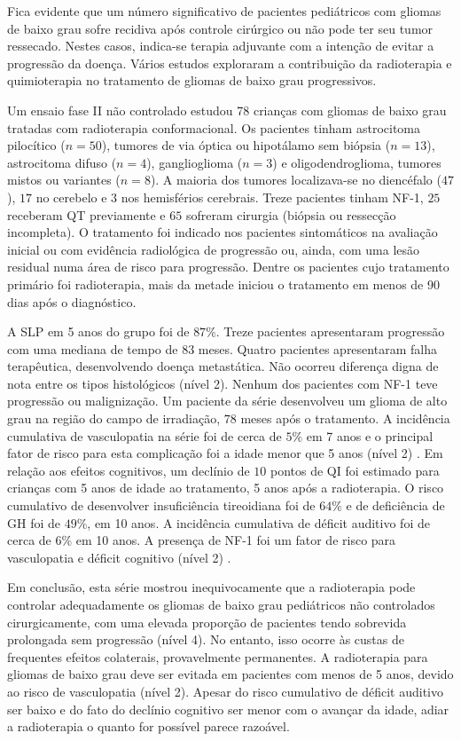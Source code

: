 \documentclass[11pt,a4paper,oldfontcommands]{memoir}
\begin{document}
Fica evidente que um número significativo de pacientes pediátricos com gliomas de baixo grau sofre recidiva após controle cirúrgico ou não pode ter seu tumor ressecado. Nestes casos, indica-se terapia adjuvante com a intenção de evitar a progressão da doença. Vários estudos exploraram a contribuição da radioterapia e quimioterapia no tratamento de gliomas de baixo grau progressivos. 

Um ensaio fase II não controlado estudou 78 crianças com gliomas de baixo grau tratadas com radioterapia conformacional. Os pacientes tinham astrocitoma pilocítico (\(n=50\)), tumores de via óptica ou hipotálamo sem biópsia (\(n=13\)), astrocitoma difuso (\(n=4\)), ganglioglioma (\(n=3\)) e oligodendroglioma, tumores mistos ou variantes (\(n=8\)). A maioria dos tumores localizava-se no diencéfalo (\(47\)), \(17\) no cerebelo e \(3\) nos hemisférios cerebrais. Treze pacientes tinham NF-1, \(25\) receberam QT previamente e \(65\) sofreram cirurgia (biópsia ou ressecção incompleta). O tratamento foi indicado nos pacientes sintomáticos na avaliação inicial ou com evidência radiológica de progressão ou, ainda, com uma lesão residual numa área de risco para progressão. Dentre os pacientes cujo tratamento primário foi radioterapia, mais da metade iniciou o tratamento em menos de 90 dias após o diagnóstico. 

A SLP em 5 anos do grupo foi de \(87\%\). Treze pacientes apresentaram progressão com uma mediana de tempo de \(83\) meses. Quatro pacientes apresentaram falha terapêutica, desenvolvendo doença metastática. Não ocorreu diferença digna de nota entre os tipos histológicos (nível 2). Nenhum dos pacientes com NF-1 teve progressão ou malignização. Um paciente da série desenvolveu um glioma de alto grau na região do campo de irradiação, \(78\) meses após o tratamento. A incidência cumulativa de vasculopatia na série foi de cerca de \(5\%\) em 7 anos e o principal fator de risco para esta complicação foi a idade menor que 5 anos (nível 2) \cite{Merchant01082009}. Em relação aos efeitos cognitivos, um declínio de \(10\) pontos de QI foi estimado para crianças com 5 anos de idade ao tratamento, 5 anos após a radioterapia. O risco cumulativo de desenvolver insuficiência tireoidiana foi de \(64\%\) e de deficiência de GH foi de \(49\%\), em 10 anos. A incidência cumulativa de déficit auditivo foi de cerca de \(6\%\) em 10 anos. A presença de NF-1 foi um fator de risco para vasculopatia e déficit cognitivo (nível 2) \cite{Merchant01082009.2}. 

Em conclusão, esta série mostrou inequivocamente que a radioterapia pode controlar adequadamente os gliomas de baixo grau pediátricos não controlados cirurgicamente, com uma elevada proporção de pacientes tendo sobrevida prolongada sem progressão (nível 4). No entanto, isso ocorre às custas de frequentes efeitos colaterais, provavelmente permanentes. A radioterapia para gliomas de baixo grau deve ser evitada em pacientes com menos de 5 anos, devido ao risco de vasculopatia (nível 2). Apesar do risco cumulativo de déficit auditivo ser baixo e do fato do declínio cognitivo ser menor com o avançar da idade, adiar a radioterapia o quanto for possível parece razoável.
\end{document}
